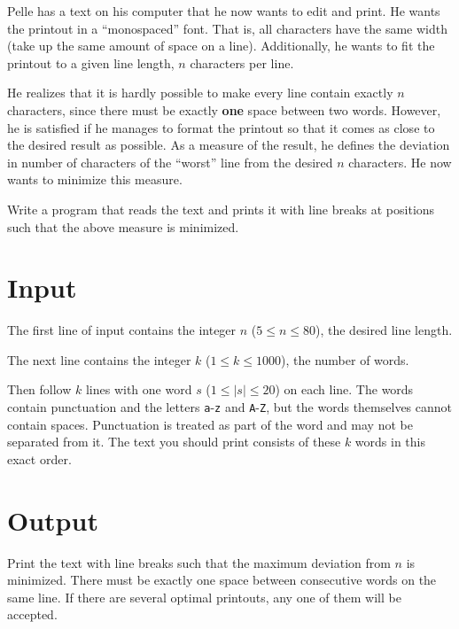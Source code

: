 
Pelle has a text on his computer that he now wants to edit and print.
He wants the printout in a ``monospaced'' font.
That is, all characters have the same width (take up the same amount of space on a line).
Additionally, he wants to fit the printout to a given line length, $n$ characters per line.

He realizes that it is hardly possible to make every line contain exactly $n$ characters,
since there must be exactly \textbf{one} space between two words.
However, he is satisfied if he manages to format the printout so that it comes as close to the desired result as possible.
As a measure of the result, he defines the deviation in number of characters of the ``worst'' line from the desired $n$ characters.
He now wants to minimize this measure.

Write a program that reads the text and prints it with line breaks at positions such that the above measure is minimized.

\section*{Input}
The first line of input contains the integer $n$ ($5 \leq n \leq 80$),
the desired line length.

The next line contains the integer $k$ ($1 \leq k \leq 1000$),
the number of words.

Then follow $k$ lines with one word $s$ ($1 \leq |s| \leq 20$) on each line.
The words contain punctuation and the letters \texttt{a}-\texttt{z} and \texttt{A}-\texttt{Z}, but the words themselves cannot contain spaces.
Punctuation is treated as part of the word and may not be separated from it.
The text you should print consists of these $k$ words in this exact order.

\section*{Output}
Print the text with line breaks such that the maximum deviation from $n$ is minimized.
There must be exactly one space between consecutive words on the same line.
If there are several optimal printouts, any one of them will be accepted.
